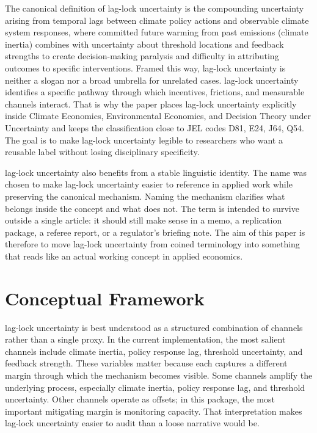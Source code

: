 \documentclass[12pt]{article}
\begin{document}
The canonical definition of lag-lock uncertainty is the compounding uncertainty arising from temporal lags between climate policy actions and observable climate system responses, where committed future warming from past emissions (climate inertia) combines with uncertainty about threshold locations and feedback strengths to create decision-making paralysis and difficulty in attributing outcomes to specific interventions. Framed this way, lag-lock uncertainty is neither a slogan nor a broad umbrella for unrelated cases. lag-lock uncertainty identifies a specific pathway through which incentives, frictions, and measurable channels interact. That is why the paper places lag-lock uncertainty explicitly inside Climate Economics, Environmental Economics, and Decision Theory under Uncertainty and keeps the classification close to JEL codes D81, E24, J64, Q54. The goal is to make lag-lock uncertainty legible to researchers who want a reusable label without losing disciplinary specificity.

lag-lock uncertainty also benefits from a stable linguistic identity. The name was chosen to make lag-lock uncertainty easier to reference in applied work while preserving the canonical mechanism. Naming the mechanism clarifies what belongs inside the concept and what does not. The term is intended to survive outside a single article: it should still make sense in a memo, a replication package, a referee report, or a regulator's briefing note. The aim of this paper is therefore to move lag-lock uncertainty from coined terminology into something that reads like an actual working concept in applied economics.

\section{Conceptual Framework}
lag-lock uncertainty is best understood as a structured combination of channels rather than a single proxy. In the current implementation, the most salient channels include climate inertia, policy response lag, threshold uncertainty, and feedback strength. These variables matter because each captures a different margin through which the mechanism becomes visible. Some channels amplify the underlying process, especially climate inertia, policy response lag, and threshold uncertainty. Other channels operate as offsets; in this package, the most important mitigating margin is monitoring capacity. That interpretation makes lag-lock uncertainty easier to audit than a loose narrative would be.
\end{document}
